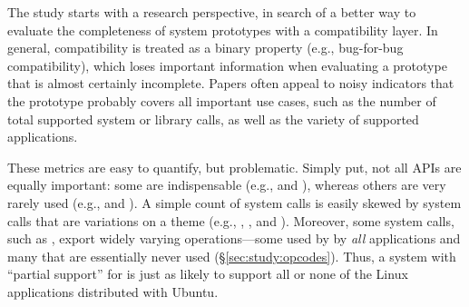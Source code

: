 \label{sec:metric:definitions}

The study starts with a research perspective, in search of a better way to evaluate
the completeness of system prototypes with a compatibility layer.
In general, compatibility is treated as a binary property
(e.g., bug-for-bug compatibility), which loses 
important information when evaluating a prototype that is almost certainly incomplete.
Papers often appeal to noisy indicators that the prototype probably covers all important use cases,
such as the number of total supported system or library calls, as well as the variety
of supported applications.


These metrics are easy to quantify, but problematic.
Simply put, not all APIs are equally important: some are indispensable (e.g.,  and ),
whereas others are very rarely used (e.g.,  and ).
A simple count of system calls is easily skewed by 
system calls that are variations on a theme (e.g., , , and ).
Moreover, some system calls, such as ,
export widely varying operations---some used by 
by {\em all} applications and many that are essentially never used (\S\ref{sec:study:opcodes}).
Thus, a system with ``partial support'' for 
is just as likely to support all or none of the Linux applications distributed with Ubuntu.





